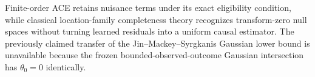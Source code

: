 Finite-order ACE retains nuisance terms under its exact eligibility condition, while classical location-family completeness theory recognizes transform-zero null spaces without turning learned residuals into a uniform causal estimator.  The previously claimed transfer of the Jin--Mackey--Syrgkanis Gaussian lower bound is unavailable because the frozen bounded-observed-outcome Gaussian intersection has \(\theta_0=0\) identically.